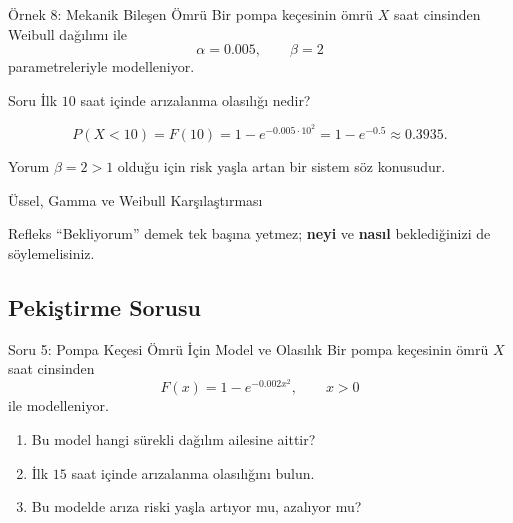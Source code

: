 \documentclass[light]{lutbeamer}
\begin{document}
\begin{frame}{Örnek 8: Mekanik Bileşen Ömrü}
    \small
    Bir pompa keçesinin ömrü \(X\) saat cinsinden Weibull dağılımı ile
    \[
    \alpha=0.005, \qquad \beta=2
    \]
    parametreleriyle modelleniyor.

    \begin{block}{Soru}
        İlk \(10\) saat içinde arızalanma olasılığı nedir?
    \end{block}

    \[
    P(X<10)=F(10)=1-e^{-0.005\cdot 10^2}=1-e^{-0.5}\approx 0.3935.
    \]

    \begin{exampleblock}{Yorum}
        \(\beta=2>1\) olduğu için risk yaşla artan bir sistem söz konusudur.
    \end{exampleblock}
\end{frame}

\begin{frame}{Üssel, Gamma ve Weibull Karşılaştırması}
    \small
    \begin{center}
    \end{center}

    \begin{alertblock}{Refleks}
        ``Bekliyorum'' demek tek başına yetmez; \textbf{neyi} ve \textbf{nasıl} beklediğinizi de söylemelisiniz.
    \end{alertblock}
\end{frame}

\subsection{Pekiştirme Sorusu}

\begin{frame}{Soru 5: Pompa Keçesi Ömrü İçin Model ve Olasılık}
    \small
    Bir pompa keçesinin ömrü \(X\) saat cinsinden
    \[
    F(x)=1-e^{-0.002x^2}, \qquad x>0
    \]
    ile modelleniyor.

    \begin{enumerate}
        \item[(a)] Bu model hangi sürekli dağılım ailesine aittir?
        \item[(b)] İlk \(15\) saat içinde arızalanma olasılığını bulun.
        \item[(c)] Bu modelde arıza riski yaşla artıyor mu, azalıyor mu?
    \end{enumerate}
\end{frame}
\end{document}

